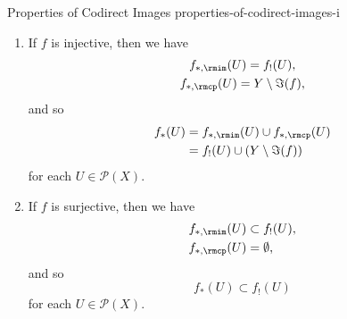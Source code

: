 \begin{proposition}{Properties of Codirect Images \rmI}{properties-of-codirect-images-i}
\begin{enumerate}
            \begin{align*}
                f_{*}(U) &= f_{!}(U^{\sfc})^{\sfc}\\
                         &= Y\setminus f_{!}(X\setminus U)
            \end{align*}
            for each $U\in\mathcal{P}(X)$.
        \item\label{properties-of-codirect-images-i-interaction-with-injections}If $f$ is injective, then we have
            \begin{gather*}
                f_{*,\rmim}(U) = f_{!}(U),\\
                f_{*,\rmcp}(U) = Y\setminus\Im(f),\\
            \end{gather*}
            and so
            \begin{align*}
                f_{*}(U) &= f_{*,\rmim}(U)\cup f_{*,\rmcp}(U)\\
                         &= f_{!}(U)\cup(Y\setminus\Im(f))
            \end{align*}
            for each $U\in\mathcal{P}(X)$.
        \item\label{properties-of-codirect-images-i-interaction-with-surjections}If $f$ is surjective, then we have
            \begin{align*}
                f_{*,\rmim}(U) &\subset  f_{!}(U),\\
                f_{*,\rmcp}(U) &=       \emptyset,\\
            \end{align*}
            and so
            \[
                f_{*}(U)%
                \subset%
                f_{!}(U)%
            \]%
            for each $U\in\mathcal{P}(X)$.
    \end{enumerate}
\end{proposition}
